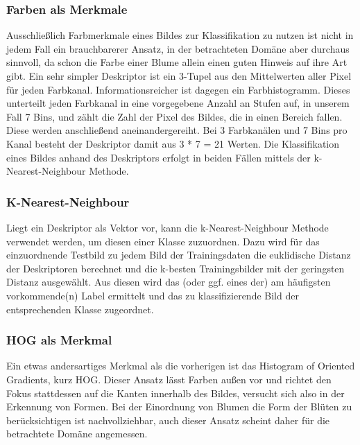 \documentclass[11pt,a4paper]{article}
\begin{document}
\subsubsection{Farben als Merkmale}
Ausschließlich Farbmerkmale eines Bildes zur Klassifikation zu nutzen ist nicht in jedem Fall ein brauchbarerer Ansatz, in der betrachteten Domäne aber durchaus sinnvoll, da schon die Farbe einer Blume allein einen guten Hinweis auf ihre Art gibt.
Ein sehr simpler Deskriptor ist ein 3-Tupel aus den Mittelwerten aller Pixel für jeden Farbkanal. Informationsreicher  ist dagegen ein Farbhistogramm. Dieses unterteilt jeden Farbkanal in eine vorgegebene Anzahl an Stufen auf, in unserem Fall 7 Bins, und zählt die Zahl der Pixel des Bildes, die in einen Bereich fallen. Diese werden anschließend aneinandergereiht. Bei 3 Farbkanälen und 7 Bins pro Kanal besteht der Deskriptor damit aus 3 * 7 = 21 Werten.
Die Klassifikation eines Bildes anhand des Deskriptors erfolgt in beiden Fällen mittels der k-Nearest-Neighbour Methode.

\subsubsection{K-Nearest-Neighbour}
Liegt ein Deskriptor als Vektor vor, kann die k-Nearest-Neighbour Methode verwendet werden, um diesen einer Klasse zuzuordnen. Dazu wird für das einzuordnende Testbild zu jedem Bild der Trainingsdaten die euklidische Distanz der Deskriptoren berechnet und die k-besten Trainingsbilder mit der geringsten Distanz ausgewählt. Aus diesen wird das (oder ggf. eines der) am häufigsten vorkommende(n) Label ermittelt und das zu klassifizierende Bild der entsprechenden Klasse zugeordnet.

\subsubsection{HOG als Merkmal}
Ein etwas andersartiges Merkmal als die vorherigen ist das Histogram of Oriented Gradients, kurz HOG. Dieser Ansatz lässt Farben außen vor und richtet den Fokus stattdessen auf die Kanten innerhalb des Bildes, versucht sich also in der Erkennung von Formen. Bei der Einordnung von Blumen die Form der Blüten zu berücksichtigen ist nachvollziehbar, auch dieser Ansatz scheint daher für die betrachtete Domäne angemessen. 
\end{document}
